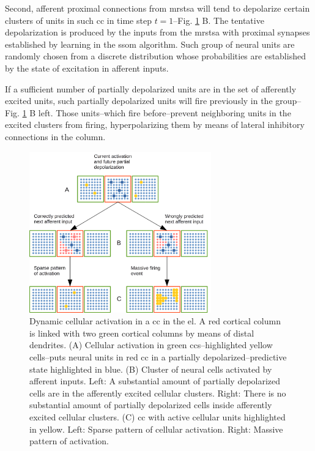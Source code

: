 {Second, afferent proximal connections from \gls{mrstsa} will tend to depolarize
certain clusters of units in such \gls{cc} in time step $t=1$--Fig. \ref{fig:Activation} B.
The tentative depolarization is produced by the inputs from the \gls{mrstsa} with
proximal synapses established by learning in the \gls{ssom} algorithm. 
Such group of neural units are randomly chosen from a discrete distribution
whose probabilities are established by the state of excitation in afferent inputs.

If a sufficient number of partially depolarized units are in the set of
afferently excited units, such partially depolarized units
will fire previously in the group--Fig. \ref{fig:Activation} B left.
Those units--which fire before--prevent neighboring units in the excited clusters from firing,
hyperpolarizing them by means of lateral inhibitory connections in the column.

\begin{figure}[h!]
    \centering
    \includegraphics[width=0.7\textwidth]{Activation.png}
    \caption{Dynamic cellular activation in a \gls{cc} in the \gls{el}.
    A red cortical column is linked with two green cortical columns by means of distal dendrites.
    (A) Cellular activation in green \glspl{cc}--highlighted yellow cells--puts neural units
    in red \gls{cc} in a partially depolarized--predictive state highlighted in blue.
    (B) Cluster of neural cells activated by afferent inputs.
    Left: A substantial amount of partially depolarized cells are in the afferently excited cellular clusters.
    Right: There is no substantial amount of partially depolarized cells inside afferently excited cellular clusters.
    (C) \gls{cc} with active cellular units highlighted in yellow.
    Left: Sparse pattern of cellular activation.
    Right: Massive pattern of activation.}
    \label{fig:Activation}
\end{figure}

}
